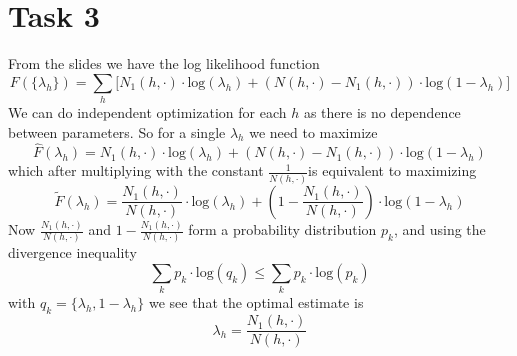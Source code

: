 \documentclass[%
   11pt,              %
   ngerman,           %
   a4paper,           %
   DIV11,             %
]{scrartcl}%
\begin{document}
\section*{Task 3}
From the slides we have the log likelihood function
\begin{equation*}
	F(\{\lambda_h\}) = \sum_h \bigg[N_1(h,\cdot)\cdot\text{log}(\lambda_h) + (N(h,\cdot) - N_1(h, \cdot))\cdot \text{log}(1 - \lambda_h)\bigg]
\end{equation*}
We can do independent optimization for each $h$ as there is no dependence between parameters. So for a single $\lambda_h$ we need to maximize
\begin{equation*}
	\hat{F}(\lambda_h) = N_1(h,\cdot)\cdot\text{log}(\lambda_h) + (N(h,\cdot) - N_1(h, \cdot))\cdot \text{log}(1 - \lambda_h)
\end{equation*}
which after multiplying with the constant $\frac{1}{N(h,\cdot)}$is equivalent to maximizing
\begin{equation*}
	\tilde{F}(\lambda_h) = \frac{N_1(h,\cdot)}{N(h,\cdot)}\cdot\text{log}(\lambda_h) + (1 - \frac{N_1(h,\cdot)}{N(h,\cdot)})\cdot \text{log}(1 - \lambda_h)
\end{equation*}
Now $\frac{N_1(h,\cdot)}{N(h,\cdot)}$ and $1 - \frac{N_1(h,\cdot)}{N(h,\cdot)}$ form a probability distribution $p_k$, and using the divergence inequality
\begin{equation*}
	\sum_k p_k \cdot\text{log}(q_k) \leq \sum_k p_k \cdot\text{log} (p_k)
\end{equation*}
with $q_k = \{\lambda_h, 1 - \lambda_h\}$ we see that the optimal estimate is 
\begin{equation*}
	\lambda_h = \frac{N_1(h,\cdot)}{N(h,\cdot)}
\end{equation*}
\end{document}
